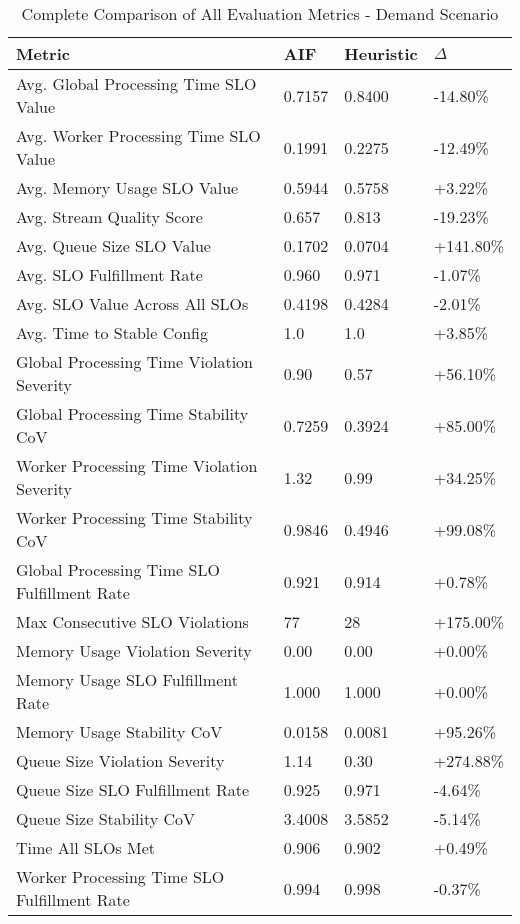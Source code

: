 \begin{table}[h!]
\centering
\small
\caption{Complete Comparison of All Evaluation Metrics - Demand Scenario}
\label{tab:complete_results_variable_computational_demand}
\begin{tabular}{@{}llll@{}}
\toprule
\textbf{Metric} & \textbf{AIF} & \textbf{Heuristic} & \textbf{$\Delta$} \\
\midrule
Avg. Global Processing Time SLO Value & 0.7157 & 0.8400 & -14.80\% \\
Avg. Worker Processing Time SLO Value & 0.1991 & 0.2275 & -12.49\% \\
Avg. Memory Usage SLO Value & 0.5944 & 0.5758 & +3.22\% \\
Avg. Stream Quality Score & 0.657 & 0.813 & -19.23\% \\
Avg. Queue Size SLO Value & 0.1702 & 0.0704 & +141.80\% \\
Avg. SLO Fulfillment Rate & 0.960 & 0.971 & -1.07\% \\
Avg. SLO Value Across All SLOs & 0.4198 & 0.4284 & -2.01\% \\
Avg. Time to Stable Config & 1.0 & 1.0 & +3.85\% \\
Global Processing Time Violation Severity & 0.90 & 0.57 & +56.10\% \\
Global Processing Time Stability CoV & 0.7259 & 0.3924 & +85.00\% \\
Worker Processing Time Violation Severity & 1.32 & 0.99 & +34.25\% \\
Worker Processing Time Stability CoV & 0.9846 & 0.4946 & +99.08\% \\
Global Processing Time SLO Fulfillment Rate & 0.921 & 0.914 & +0.78\% \\
Max Consecutive SLO Violations & 77 & 28 & +175.00\% \\
Memory Usage Violation Severity & 0.00 & 0.00 & +0.00\% \\
Memory Usage SLO Fulfillment Rate & 1.000 & 1.000 & +0.00\% \\
Memory Usage Stability CoV & 0.0158 & 0.0081 & +95.26\% \\
Queue Size Violation Severity & 1.14 & 0.30 & +274.88\% \\
Queue Size SLO Fulfillment Rate & 0.925 & 0.971 & -4.64\% \\
Queue Size Stability CoV & 3.4008 & 3.5852 & -5.14\% \\
Time All SLOs Met & 0.906 & 0.902 & +0.49\% \\
Worker Processing Time SLO Fulfillment Rate & 0.994 & 0.998 & -0.37\% \\
\bottomrule
\end{tabular}
\end{table}